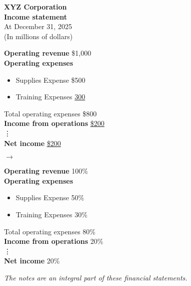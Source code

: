 \small
\begin{tcolorbox}[colframe=black,colback=white,title=Comparison of Income statement and component percentages]
    \begin{center}
        \textbf{XYZ Corporation}\\
        \textbf{Income statement}\\
        At December 31, 2025\\
        (In millions of dollars)
    \end{center}

    \begin{multicols}{3}
        \textbf{Operating revenue} \hfill \$1,000\\
        \textbf{Operating expenses} \\
        \begin{itemize}[label={}, leftmargin=*]
            \item Supplies Expense \hfill \$500
            \item Training Expenses \hfill \underline{300}
        \end{itemize}
        Total operating expenses \hfill \$800\\
        \textbf{Income from operations} \hfill \underline{\underline{\$200}}\\
        \vdots\\
        \textbf{Net income} \hfill \underline{\underline{\$200}}
        \columnbreak

        \begin{center}
            $\longrightarrow$
        \end{center}

        \columnbreak
        \textbf{Operating revenue} \hfill 100\%\\
        \textbf{Operating expenses} \\
        \begin{itemize}[label={}, leftmargin=*]
            \item Supplies Expense \hfill 50\%
            \item Training Expenses \hfill 30\%
        \end{itemize}
        Total operating expenses \hfill 80\%\\
        \textbf{Income from operations} \hfill 20\%\\
        \vdots\\
        \textbf{Net income} \hfill 20\%
    \end{multicols}

    \vspace{1em}

    \textit{\footnotesize{The notes are an integral part of these financial statements.}}
\end{tcolorbox}

